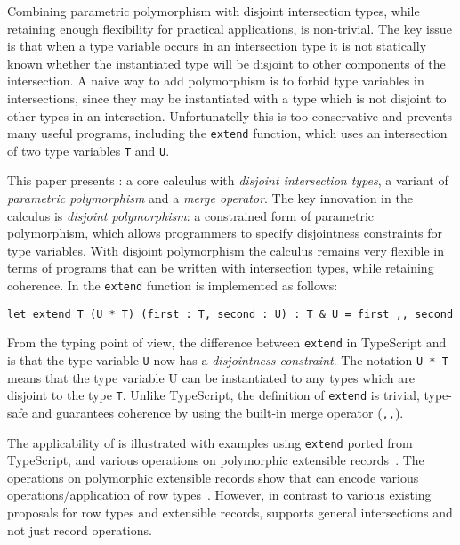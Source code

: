 Combining parametric polymorphism with disjoint intersection
types, while retaining enough flexibility for practical applications,
is non-trivial. The key issue is that when a type variable occurs in an intersection
type it is not statically known whether the instantiated type will
be disjoint to other components of the intersection.
A naive way  to add polymorphism is to forbid 
type variables in intersections, since they may be instantiated with 
a type which is not disjoint to other types in an intersction.
Unfortunatelly this is too conservative and prevents many useful 
programs, including the \lstinline{extend} function, which uses an
intersection of two type variables \lstinline{T} and \lstinline{U}. 


This paper presents \name: a core calculus with 
\emph{disjoint intersection types}, a variant of \emph{parametric polymorphism} and a
\emph{merge operator}. The key innovation in the calculus is \emph{disjoint polymorphism}: a
constrained form of parametric polymorphism, which allows programmers
to specify disjointness constraints for type variables. With disjoint
polymorphism the calculus remains very flexible in terms of programs
that can be written with intersection types, while retaining
coherence. In \name the \lstinline{extend} function is implemented
as follows:

\begin{lstlisting}
let extend T (U * T) (first : T, second : U) : T & U = first ,, second 
\end{lstlisting}

\noindent From the typing point of view, the difference between
\lstinline{extend} in TypeScript and \name is that the type variable
\lstinline{U} now has a \emph{disjointness constraint}. The notation
\lstinline{U * T} means that the type variable U can be instantiated
to any types which are disjoint to the type \lstinline{T}. Unlike
TypeScript, the definition of \lstinline{extend} is trivial, type-safe
and guarantees coherence by using the built-in merge operator (\lstinline{,,}). 

The applicability of \name is illustrated with examples using \lstinline{extend} 
ported from TypeScript, and various operations on polymorphic
extensible records~\cite{}. The operations on polymorphic extensible records
show that \name can encode various operations/application of row
types~\cite{}. However, in contrast to various existing proposals for 
row types and extensible records, \name supports general intersections 
and not just record operations.

